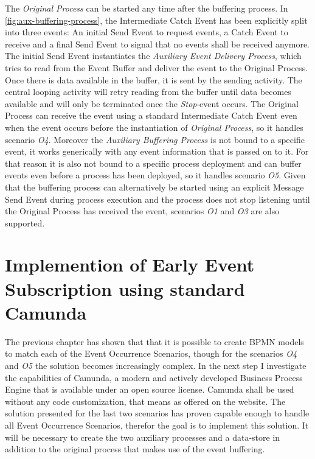 
The \textit{Original Process} can be started any time after the buffering process. In \autoref{fig:aux-buffering-process}, the Intermediate Catch Event has been explicitly split into three events: An initial Send Event to request events, a Catch Event to receive and a final Send Event to signal that no events shall be received anymore.
The initial Send Event instantiates the \textit{Auxiliary Event Delivery Process}, which tries to read from the Event Buffer and deliver the event to the Original Process. Once there is data available in the buffer, it is sent by the sending activity. The central looping activity will retry reading from the buffer until data becomes available and will only be terminated once the \textit{Stop}-event occurs. 
The Original Process can receive the event using a standard Intermediate Catch Event even when the event occurs before the instantiation of \textit{Original Process}, so it handles scenario \textit{O4}. 
Moreover the \textit{Auxiliary Buffering Process} is not bound to a specific event, it works generically with any event information that is passed on to it. For that reason it is also not bound to a specific process deployment and can buffer events even before a process has been deployed, so it handles scenario \textit{O5}.
Given that the buffering process can alternatively be started using an explicit Message Send Event during process execution and the process does not stop listening until the Original Process has received the event, scenarios \textit{O1} and \textit{O3} are also supported.


\section{Implemention of Early Event Subscription using standard Camunda}\label{ch:assessment-implementation}
The previous chapter has shown that that it is possible to create BPMN models to match each of the Event Occurrence Scenarios, though for the scenarios \textit{O4} and \textit{O5} the solution becomes increasingly complex.
In the next step I investigate the capabilities of Camunda, a modern and actively developed Business Process Engine that is available under an open source license.
Camunda shall be used without any code customization, that means as offered on the website.
The solution presented for the last two scenarios has proven capable enough to handle all Event Occurrence Scenarios, therefor the goal is to implement this solution. It will be necessary to create the two auxiliary processes and a data-store in addition to the original process that makes use of the event buffering.

